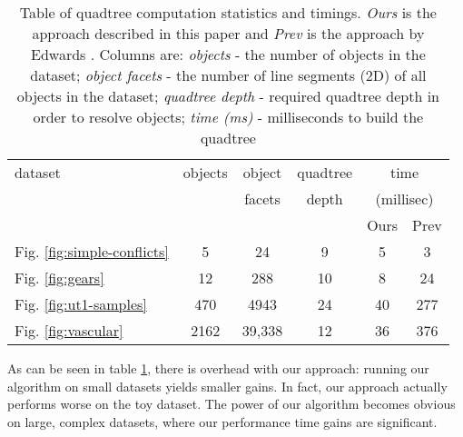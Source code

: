 \documentclass[final,3p,times,twocolumn]{elsarticle}
\begin{document}
\begin{table}
  \centering
  \footnotesize{
  \begin{tabular}{lcc|c|cc}
    \toprule
    dataset & objects & object          & quadtree
    & \multicolumn{2}{c}{time} \\
            &         & facets          & depth
    & \multicolumn{2}{c}{(millisec)} \\
           &&&
    & Ours & Prev \\
    \hline

    Fig. \ref{fig:simple-conflicts} & 5 & 24 & 9 & 5 & 3 \\

    Fig. \ref{fig:gears} & 12 & 288 & 10 & 8 & 24 \\

    Fig. \ref{fig:ut1-samples} & 470 & 4943 & 24 & 40 & 277 \\

    Fig. \ref{fig:vascular} & 2162 & 39,338 & 12 & 36 & 376 \\

    \bottomrule
  \end{tabular}}
  \caption{Table of quadtree computation statistics and timings. \emph{Ours} is the approach described in this paper and \emph{Prev} is the approach by Edwards \etal \cite{edwards2015approximating}. Columns are: \emph{objects} - the number of objects in the dataset; \emph{object facets} - the number of line segments (2D) of all objects in the dataset; \emph{quadtree depth} - required quadtree depth in order to resolve objects; \emph{time (ms)} - milliseconds to build the quadtree }
  \label{tab:timings}
\end{table}

As can be seen in table \ref{tab:timings}, there is overhead with our approach: running our algorithm on small datasets yields smaller gains. In fact, our approach actually performs worse on the toy dataset. The power of our algorithm becomes obvious on large, complex datasets, where our performance time gains are significant.
\end{document}
